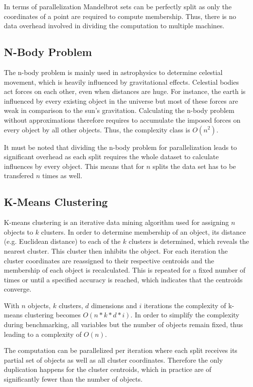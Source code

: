 In terms of parallelization Mandelbrot sets can be perfectly split as only the coordinates of a point are required to compute membership. Thus, there is no data overhead involved in dividing the computation to multiple machines.

\subsection*{N-Body Problem}

The n-body problem is mainly used in astrophysics to determine celestial movement, which is heavily influenced by gravitational effects. Celestial bodies act forces on each other, even when distances are huge. For instance, the earth is influenced by every existing object in the universe but most of these forces are weak in comparison to the sun's gravitation. Calculating the n-body problem without approximations therefore requires to accumulate the imposed forces on every object by all other objects. Thus, the complexity class is $O(n^2)$.

It must be noted that dividing the n-body problem for parallelization leads to significant overhead as each split requires the whole dataset to calculate influences by every object. This means that for $n$ splits the data set has to be transfered $n$ times as well.

\subsection*{K-Means Clustering}

K-means clustering is an iterative data mining algorithm used for assigning $n$ objects to $k$ clusters. In order to determine membership of an object, its distance (e.g. Euclidean distance) to each of the $k$ clusters is determined, which reveals the nearest cluster. This cluster then inhibits the object. For each iteration the cluster coordinates are reassigned to their respective centroids and the membership of each object is recalculated. This is repeated for a fixed number of times or until a specified accuracy is reached, which indicates that the centroids converge.

With $n$ objects, $k$ clusters, $d$ dimensions and $i$ iterations the complexity of k-means clustering becomes $O(n*k*d*i)$. In order to simplify the complexity during benchmarking, all variables but the number of objects remain fixed, thus leading to a complexity of $O(n)$.

The computation can be parallelized per iteration where each split receives its partial set of objects as well as all cluster coordinates. Therefore the only duplication happens for the cluster centroids, which in practice are of significantly fewer than the number of objects.
